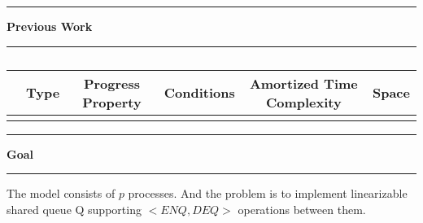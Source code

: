 \documentclass[10pt,table]{article}
\newcommand\question[1]{\vspace{1.2em}\hrule\textbf{ #1}\vspace{.5em}\hrule}
\theoremstyle{definition}
\begin{document}
\question{Previous Work}

\begin{table}[hbt]
  \begin{center}
  \begin{tabular}{l|c|c|c|c|c}
    & Type & Progress Property & Conditions & Amortized Time Complexity & Space \\
    \hline
    & & & & & \\
  \end{tabular}
  \caption{}
  \end{center}
\end{table}


\question{Goal}
The model consists of $p$ processes. And the problem is to implement linearizable shared queue Q supporting $<ENQ, DEQ>$ operations between them.

%
%
%
\end{document}
